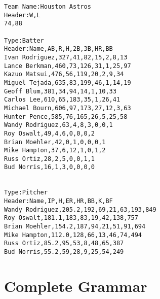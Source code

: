 \begin{verbatim}
Team Name:Houston Astros
Header:W,L
74,88

Type:Batter
Header:Name,AB,R,H,2B,3B,HR,BB
Ivan Rodriguez,327,41,82,15,2,8,13
Lance Berkman,460,73,126,31,1,25,97
Kazuo Matsui,476,56,119,20,2,9,34
Miguel Tejada,635,83,199,46,1,14,19
Geoff Blum,381,34,94,14,1,10,33
Carlos Lee,610,65,183,35,1,26,41
Michael Bourn,606,97,173,27,12,3,63
Hunter Pence,585,76,165,26,5,25,58
Wandy Rodriguez,63,4,8,3,0,0,1
Roy Oswalt,49,4,6,0,0,0,2
Brian Moehler,42,0,1,0,0,0,1
Mike Hampton,37,6,12,1,0,1,2
Russ Ortiz,28,2,5,0,0,1,1
Bud Norris,16,1,3,0,0,0,0


Type:Pitcher
Header:Name,IP,H,ER,HR,BB,K,BF
Wandy Rodriguez,205.2,192,69,21,63,193,849
Roy Oswalt,181.1,183,83,19,42,138,757
Brian Moehler,154.2,187,94,21,51,91,694
Mike Hampton,112.0,128,66,13,46,74,494
Russ Ortiz,85.2,95,53,8,48,65,387
Bud Norris,55.2,59,28,9,25,54,249

\end{verbatim}

\section{Complete Grammar}\label{grammar}


